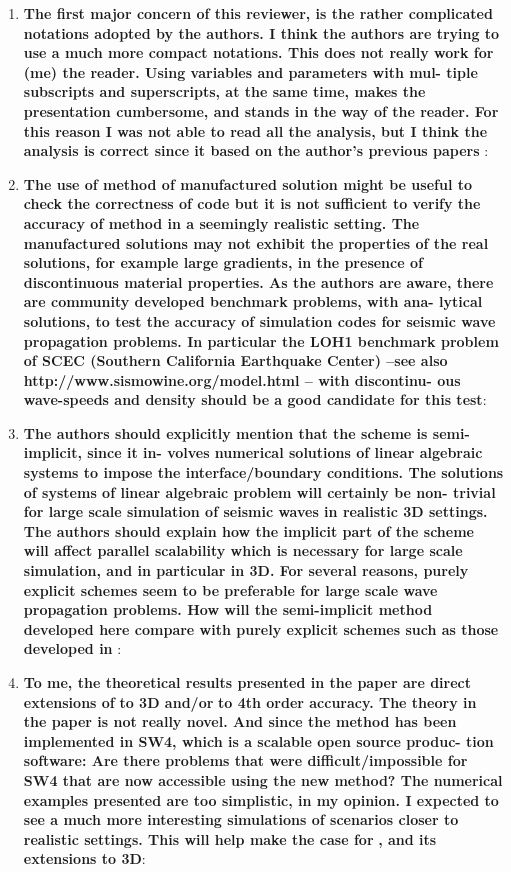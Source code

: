 \documentclass[twoside,11pt]{article}
\begin{document}
\begin{enumerate}
\item \textbf{The first major concern of this reviewer, is the rather complicated notations adopted by the authors. I think the authors are trying to use a much more compact notations. This does not really work for (me) the reader. Using variables and parameters with mul- tiple subscripts and superscripts, at the same time, makes the presentation cumbersome, and stands in the way of the reader. For this reason I was not able to read all the analysis, but I think the analysis is correct since it based on the author’s previous papers} \cite{petersson2009stable,wang2019fourth,petersson2015wave}: 

\item  \textbf{The use of method of manufactured solution might be useful to check the correctness of code but it is not sufficient to verify the accuracy of method in a seemingly realistic setting. The manufactured solutions may not exhibit the properties of the real solutions, for example large gradients, in the presence of discontinuous material properties. As the authors are aware, there are community developed benchmark problems, with ana- lytical solutions, to test the accuracy of simulation codes for seismic wave propagation problems. In particular the LOH1 benchmark problem of SCEC (Southern California Earthquake Center) –see also http://www.sismowine.org/model.html – with discontinu- ous wave-speeds and density should be a good candidate for this test}: 

\item  \textbf{The authors should explicitly mention that the scheme is semi-implicit, since it in- volves numerical solutions of linear algebraic systems to impose the interface/boundary conditions. The solutions of systems of linear algebraic problem will certainly be non- trivial for large scale simulation of seismic waves in realistic 3D settings. The authors should explain how the implicit part of the scheme will affect parallel scalability which is necessary for large scale simulation, and in particular in 3D. For several reasons, purely explicit schemes seem to be preferable for large scale wave propagation problems. How will the semi-implicit method developed here compare with purely explicit schemes such as those developed in} \cite{virta2014acoustic,duru2014stable}: 

\item  \textbf{To me, the theoretical results presented in the paper are direct extensions of} \cite{wang2019fourth} \textbf{to 3D and/or} \cite{petersson2009stable} \textbf{to 4th order accuracy. The theory in the paper is not really novel. And since the method has been implemented in SW4, which is a scalable open source produc- tion software: Are there problems that were difficult/impossible for SW4 that are now accessible using the new method? The numerical examples presented are too simplistic, in my opinion. I expected to see a much more interesting simulations of scenarios closer to realistic settings. This will help make the case for} \cite{wang2019fourth}\textbf{, and its extensions to 3D}: 


\end{enumerate}
\end{document}
